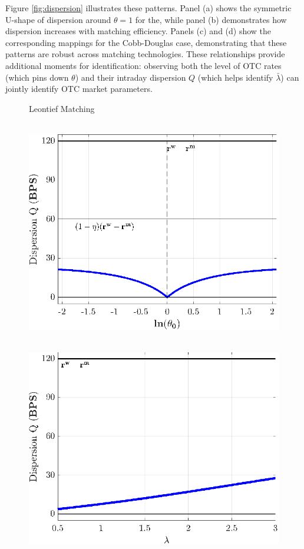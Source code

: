 \documentclass[12pt,american,english,notitlepage]{article}
\begin{document}
Figure \ref{fig:dispersion} illustrates these patterns. Panel (a)
shows the symmetric U-shape of dispersion around $\theta=1$ for the,
while panel (b) demonstrates how dispersion increases with matching
efficiency. Panels (c) and (d) show the corresponding mappings for the Cobb-Douglas case, demonstrating that these patterns are robust
across matching technologies. These relationships provide additional
moments for identification: observing both the level of OTC rates
(which pins down $\theta$) and their intraday dispersion $Q$ (which
helps identify $\bar{\lambda}$) can jointly identify OTC market parameters. 

\begin{figure}[htb]
\begin{centering}

\centerline{Leontief Matching}
   \begin{minipage}[b]{.49\linewidth} 
    \\[4pt]
   \includegraphics[width=1\linewidth]{NewCode/Figures/F_l_Q_theta.eps}
\end{minipage}
\begin{minipage}[b]{.49\linewidth}
 \\[4pt]
\includegraphics[width=1\linewidth]{NewCode/Figures/F_l_Q_lambda.eps}

\end{minipage}
\end{centering}
\end{figure}
\end{document}
